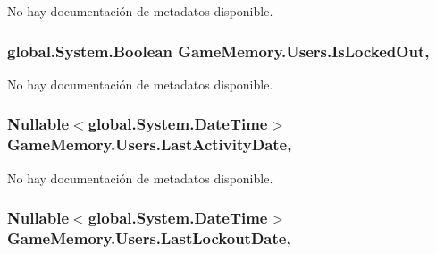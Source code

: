 No hay documentación de metadatos disponible. 

\hypertarget{class_game_memory_1_1_users_a4def29e0222bfd127b6859ade7a5ca87}{
\subsubsection[{Is\-Locked\-Out}]{\setlength{\rightskip}{0pt plus 5cm}global.\-System.\-Boolean Game\-Memory.\-Users.\-Is\-Locked\-Out\hspace{0.3cm}{\ttfamily [get]}, {\ttfamily [set]}}}\label{class_game_memory_1_1_users_a4def29e0222bfd127b6859ade7a5ca87}


No hay documentación de metadatos disponible. 

\hypertarget{class_game_memory_1_1_users_a86ea14d379459264427b6109be5a1a59}{
\subsubsection[{Last\-Activity\-Date}]{\setlength{\rightskip}{0pt plus 5cm}Nullable$<$global.\-System.\-Date\-Time$>$ Game\-Memory.\-Users.\-Last\-Activity\-Date\hspace{0.3cm}{\ttfamily [get]}, {\ttfamily [set]}}}\label{class_game_memory_1_1_users_a86ea14d379459264427b6109be5a1a59}


No hay documentación de metadatos disponible. 

\hypertarget{class_game_memory_1_1_users_aac14661b4cd2906d5d4699b9b1b6fea8}{
\subsubsection[{Last\-Lockout\-Date}]{\setlength{\rightskip}{0pt plus 5cm}Nullable$<$global.\-System.\-Date\-Time$>$ Game\-Memory.\-Users.\-Last\-Lockout\-Date\hspace{0.3cm}{\ttfamily [get]}, {\ttfamily [set]}}}\label{class_game_memory_1_1_users_aac14661b4cd2906d5d4699b9b1b6fea8}


